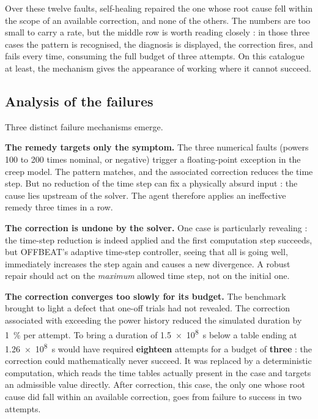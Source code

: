 Over these twelve faults, self-healing repaired the one whose root cause fell
within the scope of an available correction, and none of the others. The numbers
are too small to carry a rate, but the middle row is worth reading closely : in
those three cases the pattern is recognised, the diagnosis is displayed, the
correction fires, and fails every time, consuming the full budget of three
attempts. On this catalogue at least, the mechanism gives the appearance of
working where it cannot succeed.

\subsection{Analysis of the failures}

Three distinct failure mechanisms emerge.

\textbf{The remedy targets only the symptom.} The three numerical faults (powers
\num{100} to \num{200} times nominal, or negative) trigger a floating-point
exception in the creep model. The pattern matches, and the associated correction
reduces the time step. But no reduction of the time step can fix a physically
absurd input : the cause lies upstream of the solver. The agent therefore applies
an ineffective remedy three times in a row.

\textbf{The correction is undone by the solver.} One case is particularly
revealing : the time-step reduction is indeed applied and the first computation
step succeeds, but OFFBEAT's adaptive time-step controller, seeing that all is
going well, immediately increases the step again and causes a new divergence. A
robust repair should act on the \emph{maximum} allowed time step, not on the
initial one.

\textbf{The correction converges too slowly for its budget.} The benchmark
brought to light a defect that one-off trials had not revealed. The correction
associated with exceeding the power history reduced the simulated duration by
\SI{1}{\percent} per attempt. To bring a duration of \SI{1.5e8}{\second} below a
table ending at \SI{1.26e8}{\second} would have required \textbf{eighteen}
attempts for a budget of \textbf{three} : the correction could mathematically
never succeed. It was replaced by a deterministic computation, which reads the
time tables actually present in the case and targets an admissible value
directly. After correction, this case, the only one whose root cause did fall
within an available correction, goes from failure to success in two attempts.

